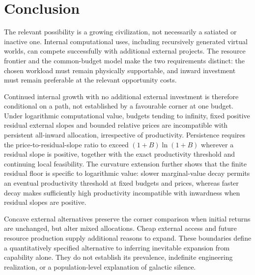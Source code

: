 \section{Conclusion}
The relevant possibility is a growing civilization, not necessarily a
satiated or inactive one. Internal computational uses, including recursively
generated virtual worlds, can compete successfully with additional external
projects. The resource frontier and the common-budget model make the two
requirements distinct: the chosen workload must remain physically
supportable, and inward investment must remain preferable at the relevant
opportunity costs.

Continued internal growth with no additional external investment is
therefore conditional on a path, not established by a favourable corner
at one budget. Under logarithmic computational value, budgets tending to
infinity, fixed positive residual external slopes and bounded relative
prices are incompatible with persistent all-inward allocation, irrespective
of productivity. Persistence requires the price-to-residual-slope ratio to
exceed $(1+B)\ln(1+B)$ wherever a residual slope is positive, together
with the exact productivity threshold and continuing local feasibility.
The curvature extension further shows that the finite residual floor is
specific to logarithmic value: slower marginal-value decay permits an
eventual productivity threshold at fixed budgets and prices, whereas
faster decay makes sufficiently high productivity incompatible with
inwardness when residual slopes are positive.

Concave external alternatives preserve the corner comparison when initial
returns are unchanged, but alter mixed allocations. Cheap external access
and future resource production supply additional reasons to expand.
These boundaries define a quantitatively specified alternative to
inferring inevitable expansion from capability alone.
They do not establish its prevalence, indefinite engineering realization,
or a population-level explanation of galactic silence.

